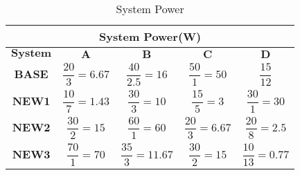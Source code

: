\documentclass{tufte-handout}
\begin{document}
	\begin{table}[!h]
	    \centering
	    \selectfont
		\renewcommand{\arraystretch}{3.0}
		\label{tab:abs-power}
	    \begin{tabular}{c|c|c|c|c}
	      \toprule
		  \multicolumn{5}{|c|}{System Power(W)}  \\
	      \midrule 
		  $\textbf{System}$ & $\textbf{A}$ & $\textbf{B}$ & $\textbf{C}$ & $\textbf{D}$ \\  %
		  $\textbf{BASE}$ & $\dfrac{20}{3}=6.67$ & $\dfrac{40}{2.5} = 16$ & $\dfrac{50}{1} = 50$ & $\dfrac{15}{12}$ \\ 
		  $\textbf{NEW1}$ & $\dfrac{10}{7}=1.43$ & $\dfrac{30}{3} = 10$ & $\dfrac{15}{5} = 3$ & $\dfrac{30}{1} = 30$ \\ 
		  $\textbf{NEW2}$ & $\dfrac{30}{2}=15$ & $\dfrac{60}{1} = 60$ & $\dfrac{20}{3} = 6.67$ & $\dfrac{20}{8} = 2.5$ \\ 
		  $\textbf{NEW3}$ & $\dfrac{70}{1}=70$ & $\dfrac{35}{3} = 11.67$ & $\dfrac{30}{2} = 15$ & $\dfrac{10}{13} = 0.77$ \\
	      \bottomrule
	    \end{tabular}
	    \caption{ System Power }
	  \end{table}

  
  
  
  
\end{document}
